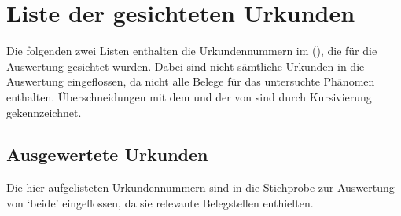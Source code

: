 \chapter{Liste der gesichteten Urkunden}
\label{sec:urkliste}

Die folgenden zwei Listen enthalten die Urkundennummern im  (\CAO), die für die Auswertung gesichtet wurden.
Dabei sind nicht sämtliche Urkunden in die Auswertung eingeflossen, da nicht
alle Belege für das untersuchte Phänomen enthalten. Überschneidungen mit dem
\REM{} und der  von \citet{ksw3,ksw2} sind
durch Kursivierung gekennzeichnet.

\section{Ausgewertete Urkunden}
\label{subsec:ausgewurk}

Die hier aufgelisteten Urkundennummern sind in die Stichprobe zur Auswertung von
 `beide' eingeflossen, da sie relevante Belegstellen enthielten.

